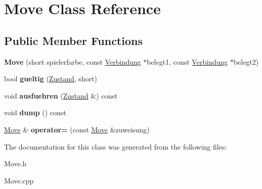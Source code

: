 \hypertarget{class_move}{\section{Move Class Reference}
\label{class_move}
}
\subsection*{Public Member Functions}
\begin{DoxyCompactItemize}
\item 
\hypertarget{class_move_adad54af2a6af52e8a1b37cc0c28a9c03}{{\bfseries Move} (short spielerfarbe, const \hyperlink{class_verbindung}{Verbindung} $\ast$belegt1, const \hyperlink{class_verbindung}{Verbindung} $\ast$belegt2)}\label{class_move_adad54af2a6af52e8a1b37cc0c28a9c03}

\item 
\hypertarget{class_move_a4a681053577ea9b245e8794c427fe910}{bool {\bfseries gueltig} (\hyperlink{class_zustand}{Zustand}, short)}\label{class_move_a4a681053577ea9b245e8794c427fe910}

\item 
\hypertarget{class_move_a982e038b4f43336bf8396d8e63f9cebb}{void {\bfseries ausfuehren} (\hyperlink{class_zustand}{Zustand} \&) const }\label{class_move_a982e038b4f43336bf8396d8e63f9cebb}

\item 
\hypertarget{class_move_a5fd65957977d9e30fd8898fa4a14ac56}{void {\bfseries dump} () const }\label{class_move_a5fd65957977d9e30fd8898fa4a14ac56}

\item 
\hypertarget{class_move_a2cae41881447ddc9496cff2800ce01e2}{\hyperlink{class_move}{Move} \& {\bfseries operator=} (const \hyperlink{class_move}{Move} \&zuweisung)}\label{class_move_a2cae41881447ddc9496cff2800ce01e2}

\end{DoxyCompactItemize}


The documentation for this class was generated from the following files\-:\begin{DoxyCompactItemize}
\item 
Move.\-h\item 
Move.\-cpp\end{DoxyCompactItemize}
